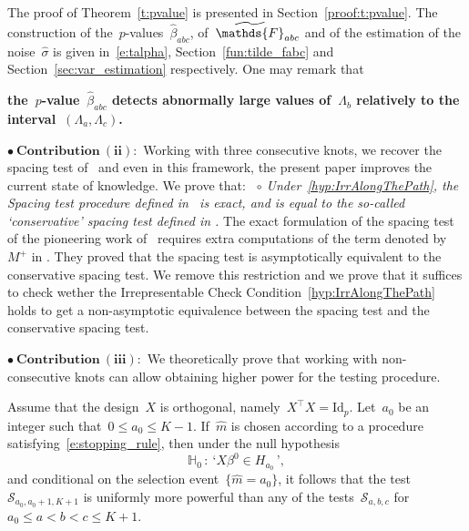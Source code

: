 \documentclass[final,numbib]{imaiai}%
\numberwithin{equation}{section}
\def\cS{\mathcal{S}}
\def\bbF{\mathds{F}}
\renewcommand{\hat}{\widehat}
\renewcommand{\tilde}{\widetilde}
\newcommand{\<}{\langle}
\renewcommand{\>}{\rangle}
\newcommand{\1}{\mathds{1}}
\begin{document}
{{\noindent
The proof of Theorem~\ref{t:pvalue} is presented in Section~\ref{proof:t:pvalue}.
The construction of the~$p$-values~$\hat\beta_{abc}$, of~$\tilde\bbF_{abc}$ and of the estimation of the noise~$\hat\sigma$ is given in~\eqref{e:talpha}, Section~\ref{fun:tilde_fabc} and Section~\ref{sec:var_estimation} respectively. One may remark that  
\begin{center}
{\bf 
the~$p$-value~$\hat\beta_{abc}$ detects abnormally large values of~$\Lambda_b$ relatively to the interval~$(\Lambda_a,\Lambda_c)$.}
\end{center}

\medskip

{
\noindent
$\bullet\ \mathbf{{Contribution\ }(ii)}:$ Working with three consecutive knots, we recover the spacing test of~\cite{taylor2014exact} and even in this framework, the present  paper improves the current state of knowledge.
We prove that:\smallskip
\newline
\noindent
{\it~$\circ$ Under~\eqref{hyp:IrrAlongThePath}, the Spacing test procedure defined in~\cite[Theorem 1]{taylor2014exact} is exact, and is equal to the so-called `conservative' spacing test defined in \cite[Theorem~2]{taylor2014exact}.}
\smallskip
\newline
The exact formulation of the spacing test of the pioneering work of~\cite{taylor2014exact} requires extra computations of the term denoted by~$M^+$ in \cite[Lemma~5]{taylor2014exact}.
They proved that the spacing test is asymptotically equivalent to the conservative spacing test.
We remove this restriction and we prove that it suffices to check wether the Irrepresentable Check Condition~\eqref{hyp:IrrAlongThePath} holds to get a non-asymptotic equivalence between the spacing test and the conservative spacing test.

\medskip

{
\noindent
$\bullet\ \mathbf{{Contribution\ }(iii)}:$  We theoretically prove that working with non-consecutive knots can allow obtaining higher power for the testing procedure.

 \begin{theorem}
 \label{thm:zazPower}
Assume that the design~$X$ is orthogonal, namely~$X^\top X=\mathrm{Id}_{p}$.
Let~$a_0$ be an integer such that~$0\leq a_0\leq K-1$.
If~$\hat m$ is chosen according to a procedure satisfying~{\eqref{e:stopping_rule}}, then under the null hypothesis
\[
\mathds H_0\,:\ \text{`}X\beta^0\in H_{a_0}\,\text{'},
\] 
and conditional on the selection event~$\big\{\hat m=a_0\big\}$, it follows that the test~$\cS_{a_0,a_0+1,K+1}$ is uniformly more powerful than any of the tests~$ \cS_{a,b,c}$ for~$a_0\leq a <b<c \leq K+1$.
 \end{theorem}

}}}}
\end{document}
